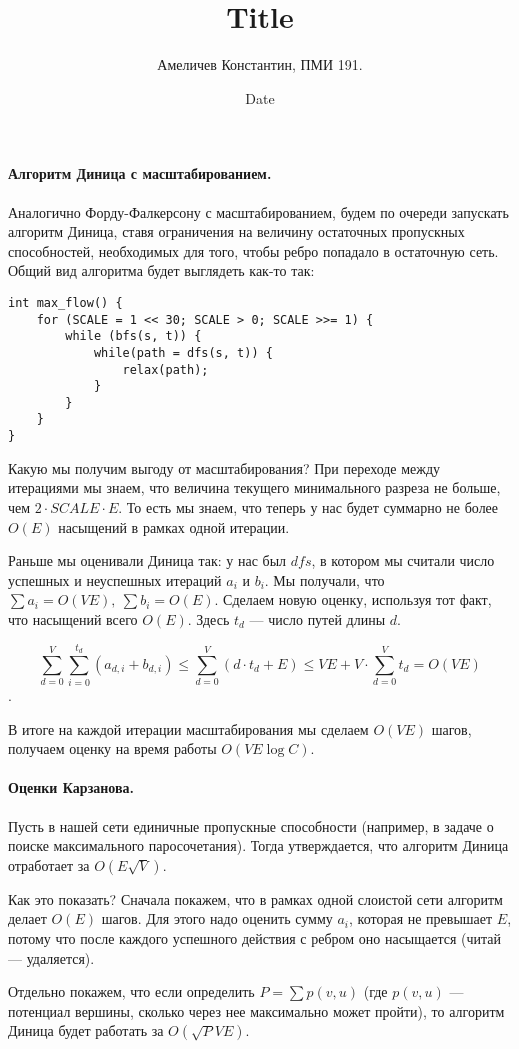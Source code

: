\documentclass[12pt]{article}
\title{Title}
\author{Амеличев Константин, ПМИ 191.}
\date{Date}
\newcommand{\rangesum}[2]{\displaystyle \sum_{#1}^{#2}}
\begin{document}
\paragraph{Алгоритм Диница с масштабированием.} Аналогично Форду-Фалкерсону с масштабированием, будем по очереди запускать алгоритм Диница, ставя ограничения на величину остаточных пропускных способностей, необходимых для того, чтобы ребро попадало в остаточную сеть. Общий вид алгоритма будет выглядеть как-то так:

\begin{verbatim}
int max_flow() {
    for (SCALE = 1 << 30; SCALE > 0; SCALE >>= 1) {
        while (bfs(s, t)) {
            while(path = dfs(s, t)) {
                relax(path);
            }
        }
    }
}
\end{verbatim}

Какую мы получим выгоду от масштабирования? При переходе между итерациями мы знаем, что величина текущего минимального разреза не больше, чем $2 \cdot SCALE \cdot E$. То есть мы знаем, что теперь у нас будет суммарно не более $O(E)$ насыщений в рамках одной итерации.

Раньше мы оценивали Диница так: у нас был $dfs$, в котором мы считали число успешных и неуспешных итераций $a_i$ и $b_i$. Мы получали, что $\sum a_i = O(VE),\ \sum b_i = O(E)$. Сделаем новую оценку, используя тот факт, что насыщений всего $O(E)$. Здесь $t_d$ --- число путей длины $d$.

$$\rangesum{d=0}{V} \rangesum{i=0}{t_d} (a_{d, i} + b_{d, i}) \le \rangesum{d=0}{V} (d \cdot t_d + E) \le VE + V \cdot \rangesum{d=0}{V} t_d = O(VE)$$.

В итоге на каждой итерации масштабирования мы сделаем $O(VE)$ шагов, получаем оценку на время работы $O(VE \log C)$.

\paragraph{Оценки Карзанова.} Пусть в нашей сети единичные пропускные способности (например, в задаче о поиске максимального паросочетания). Тогда утверждается, что алгоритм Диница отработает за $O(E \sqrt{V})$.

Как это показать? Сначала покажем, что в рамках одной слоистой сети алгоритм делает $O(E)$ шагов. Для этого надо оценить сумму $a_i$, которая не превышает $E$, потому что после каждого успешного действия с ребром оно насыщается (читай --- удаляется).

Отдельно покажем, что если определить $P = \sum p(v, u)$ (где $p(v, u)$ --- потенциал вершины, сколько через нее максимально может пройти), то алгоритм Диница будет работать за $O(\sqrt{P} VE)$.
\end{document}
